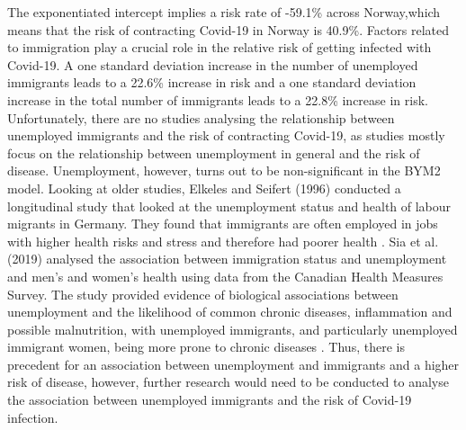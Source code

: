 The exponentiated intercept implies a risk rate of -59.1\% across Norway,which means that the risk of contracting Covid-19 in Norway is 40.9\%. Factors related to immigration play a crucial role in the relative risk of getting infected with Covid-19. A one standard deviation increase in the number of unemployed immigrants leads to a 22.6\% increase in risk and a one standard deviation increase in the total number of immigrants leads to a 22.8\% increase in risk. Unfortunately, there are no studies analysing the relationship between unemployed immigrants and the risk of contracting Covid-19, as studies mostly focus on the relationship between unemployment in general and the risk of disease. Unemployment, however, turns out to be non-significant in the BYM2 model. Looking at older studies, Elkeles and Seifert (1996) conducted a longitudinal study that looked at the unemployment status and health of labour migrants in Germany. They found that immigrants are often employed in jobs with higher health risks and stress and therefore had poorer health \autocite[][]{elkeles1996immigrants}. Sia et al. (2019) analysed the association between immigration status and unemployment and men's and women's health using data from the Canadian Health Measures Survey. The study provided evidence of biological associations between unemployment and the likelihood of common chronic diseases, inflammation and possible malnutrition, with unemployed immigrants, and particularly unemployed immigrant women, being more prone to chronic diseases \autocite[][]{sia2019chronic}. Thus, there is precedent for an association between unemployment and immigrants and a higher risk of disease, however, further research would need to be conducted to analyse the association between unemployed immigrants and the risk of Covid-19 infection. \\
